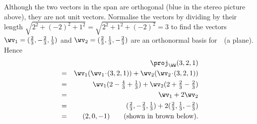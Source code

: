 \begin{example}
\begin{enumerate}
{{}}%
\begin{center}\end{center}
\begin{solution} 
Although the two vectors in the span are orthogonal (blue in the stereo picture above), they are not unit vectors.  
Normalise the vectors by dividing by their length \(\sqrt{2^2+(-2)^2+1^2}=\sqrt{2^2+1^2+(-2)^2}=3\) to find the vectors \(\wv_1=(\frac23,-\frac23,\frac13)\) and  \(\wv_2=(\frac23,\frac13,-\frac23)\) are an orthonormal basis for~\WW\ (a plane).
Hence 
\begin{eqnarray*}
&&\proj_\WW(3,2,1)
\\&=&\wv_1(\wv_1\cdot(3,2,1))+\wv_2(\wv_2\cdot(3,2,1))
\\&=&\wv_1(2-\tfrac43+\tfrac13)
+\wv_2(2+\tfrac23-\tfrac23)
\\&=&\wv_1+2\wv_2
\\&=&(\tfrac23,-\tfrac23,\tfrac13)+2(\tfrac23,\tfrac13,-\tfrac23)
\\&=&(2,0,-1) 
\qquad(\text{shown in brown below}).
\end{eqnarray*}%
\begin{center}\end{center}
\end{solution}


\end{enumerate}
\end{example}
